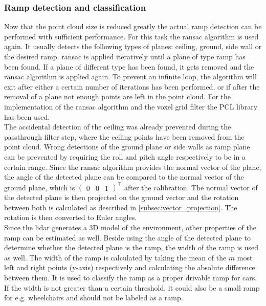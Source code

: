 \subsubsection{Ramp detection and classification}
\label{sssec:ramp_detecion_lidar}
Now that the point cloud size is reduced greatly the actual ramp detection can be performed with sufficient performance.
For this task the \gls{ransac} algorithm is used again.
It usually detects the following types of planes: ceiling, ground, side wall or the desired ramp.
\gls{ransac} is applied iteratively until a plane of type ramp has been found.
If a plane of different type has been found, it gets removed and the \gls{ransac} algorithm is applied again.
To prevent an infinite loop, the algorithm will exit after either a certain number of iterations has been performed, or if after the removal of a plane not enough points are left in the point cloud.
For the implementation of the \gls{ransac} algorithm and the voxel grid filter the PCL library \cite{Rusu2011} has been used.\\
The accidental detection of the ceiling was already prevented during the passthrough filter step, where the ceiling points have been removed from the point cloud.
Wrong detections of the ground plane or side walls as ramp plane can be prevented by requiring the roll and pitch angle respectively to be in a certain range.
Since the \gls{ransac} algorithm provides the normal vector of the plane, the angle of the detected plane can be compared to the normal vector of the ground plane, which is $\left(\begin{array}{lll} 0 & 0 & 1 \end{array}\right)^{\intercal}$ after the calibration.
The normal vector of the detected plane is then projected on the ground vector and the rotation between both is calculated as described in \cref{subsec:vector_projection}.
The rotation is then converted to Euler angles.\\
Since the \gls{lidar} generates a 3D model of the environment, other properties of the ramp can be estimated as well.
Beside using the angle of the detected plane to determine whether the detected plane is the ramp, the width of the ramp is used as well.
The width of the ramp is calculated by taking the mean of the $m$ most left and right points (y-axis) respectively and calculating the absolute difference between them.
It is used to classify the ramp as a proper drivable ramp for cars.
If the width is not greater than a certain threshold, it could also be a small ramp for e.g. wheelchairs and should not be labeled as a ramp.
